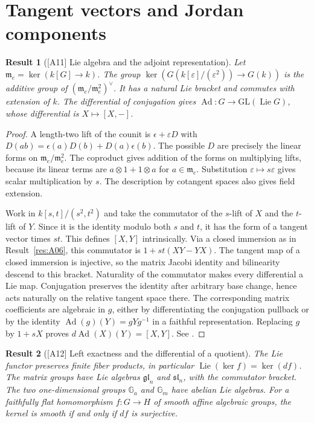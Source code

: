 \documentclass[11pt,a4paper,openany,oneside]{book}
\theoremstyle{resultstyle}
\newtheorem{statement}{Result}[chapter]
\newenvironment{result}[2]{\clubpenalty=10000\begin{statement}[\textnormal{[#1]} #2]\leavevmode\label{res:#1}\ignorespaces}{\end{statement}}
\theoremstyle{definition}
\numberwithin{equation}{chapter}
\begin{document}
\section{Tangent vectors and Jordan components}

\begin{result}{A11}{Lie algebra and the adjoint representation}
Let \(\mathfrak m_e=\ker(k[G]\to k)\).
The group \(\ker(G(k[\varepsilon]/(\varepsilon^2))\to G(k))\)
is the additive group of
\((\mathfrak m_e/\mathfrak m_e^2)^\vee\). It has a natural Lie bracket
and commutes with extension of \(k\). The differential of conjugation
gives \(\operatorname{Ad}:G\to\mathrm{GL}(\operatorname{Lie}G)\), whose
differential is \(X\mapsto [X,-]\).
\end{result}

\begin{proof}
A length-two lift of the counit is \(\epsilon+\varepsilon D\) with
\(D(ab)=\epsilon(a)D(b)+D(a)\epsilon(b)\). The possible \(D\) are
precisely the linear forms on \(\mathfrak m_e/\mathfrak m_e^2\).
The coproduct gives addition of the forms on multiplying lifts,
because its linear terms are \(a\otimes1+1\otimes a\) for
\(a\in\mathfrak m_e\). Substitution \(\varepsilon\mapsto s\varepsilon\)
gives scalar multiplication by \(s\). The description by cotangent
spaces also gives field extension.

Work in \(k[s,t]/(s^2,t^2)\) and take the commutator of the \(s\)-lift
of \(X\) and the \(t\)-lift of \(Y\). Since it is the identity modulo
both \(s\) and \(t\), it has the form of a tangent vector times \(st\).
This defines \([X,Y]\) intrinsically. Via a closed immersion as in
Result~\ref{res:A06}, this commutator is
\(1+st(XY-YX)\). The tangent map of a closed immersion is injective,
so the matrix Jacobi identity and bilinearity descend to this bracket.
Naturality of the commutator makes every differential a Lie map.
Conjugation preserves the identity after arbitrary base change, hence
acts naturally on the relative tangent space there. The corresponding
matrix coefficients are algebraic in \(g\), either by differentiating
the conjugation pullback or by the identity
\(\operatorname{Ad}(g)(Y)=gYg^{-1}\) in a faithful representation.
Replacing \(g\) by \(1+sX\) proves \(d\operatorname{Ad}(X)(Y)=[X,Y]\).
See \cite[\S10.b, 10.6--10.24 and Propositions 10.28--10.29]{milne}.
\end{proof}

\begin{result}{A12}{Left exactness and the differential of a quotient}
The Lie functor preserves finite fiber products, in particular
\(\operatorname{Lie}(\ker f)=\ker(df)\). The matrix groups have Lie
algebras \(\mathfrak{gl}_n\) and \(\mathfrak{sl}_n\), with the
commutator bracket. The two one-dimensional groups \(\mathbb G_a\)
and \(\mathbb G_m\) have abelian Lie algebras. For a faithfully flat
homomorphism \(f:G\to H\) of smooth affine algebraic groups, the
kernel is smooth if and only if \(df\) is surjective.
\end{result}
\end{document}
